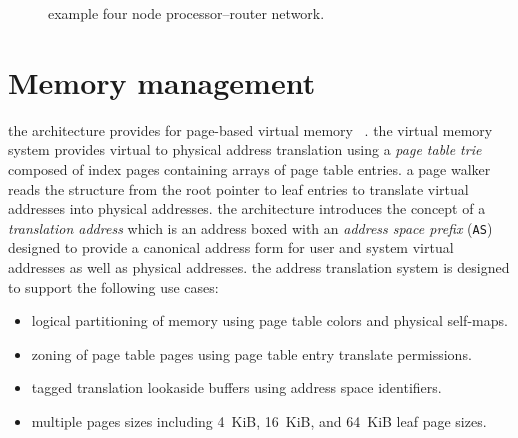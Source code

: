 \begin{figure}[H]
\caption{example four node processor--router network.}
\label{fig:example-four-node-processor-router-network}
\end{figure}

\newpage
\section{Memory management}

the architecture provides for page-based virtual memory%
~\cite{denning1970virtual}. the virtual memory system provides virtual to
physical address translation using a \emph{page table trie} composed of
index pages containing arrays of page table entries. a page walker reads
the structure from the root pointer to leaf entries to translate virtual
addresses into physical addresses. the architecture introduces the
concept of a \emph{translation address} which is an address boxed with
an \emph{address space prefix} (\texttt{AS}) designed to provide a
canonical address form for user and system virtual addresses as
well as physical addresses.
\para
the address translation system is designed to support the following use cases:
\begin{itemize}[itemsep=0pt]
\item logical partitioning of memory using page table colors and physical self-maps.
\item zoning of page table pages using page table entry translate permissions.
\item tagged translation lookaside buffers using address space identifiers.
\item multiple pages sizes including 4~KiB, 16~KiB, and 64~KiB leaf page sizes.
\end{itemize}

